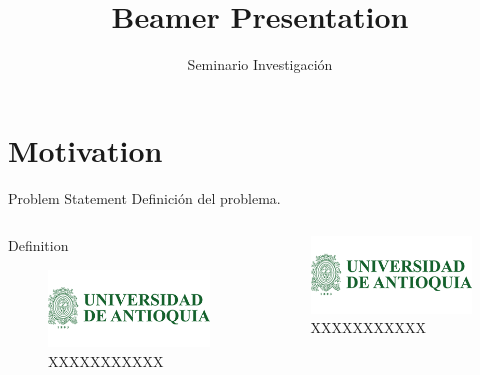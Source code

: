 \documentclass{beamer}
\title{Beamer Presentation}
\author{Seminario Investigación}
\begin{document}
	
	\frame[plain]{\titlepage}
	
	\section{Motivation}
	
	\begin{frame}{Problem Statement}
Definición del problema.


	
	\begin{columns}
		\begin{column}{0.45\linewidth}
			\begin{block}{Definition}
				\begin{figure}
				\includegraphics[width=0.5\linewidth]{logos/logoUdeA}
				\caption{XXXXXXXXXXX}
			\end{figure}
			\end{block}
		\end{column}
	\begin{column}{0.45\linewidth}
		\begin{figure}
			\includegraphics[width=0.5\linewidth]{logos/logoUdeA}
			\caption{XXXXXXXXXXX}
		\end{figure}
	\end{column}
	\end{columns}


\end{frame}
\end{document}
